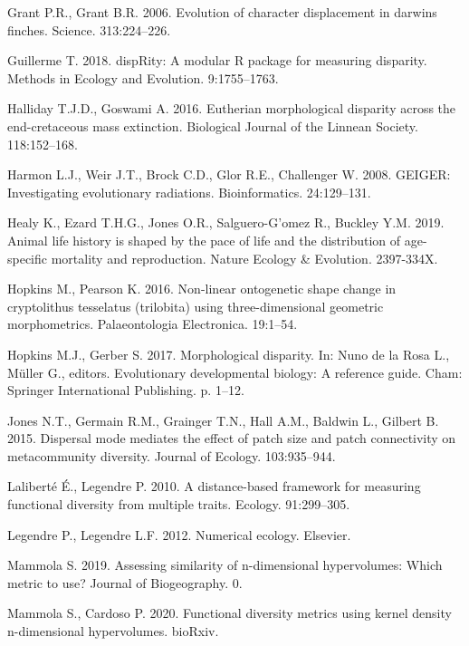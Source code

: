 \documentclass[]{article}
\begin{document}
\hypertarget{ref-grant2006}{}
Grant P.R., Grant B.R. 2006. Evolution of character displacement in
darwins finches. Science. 313:224--226.

\hypertarget{ref-disprity}{}
Guillerme T. 2018. dispRity: A modular R package for measuring
disparity. Methods in Ecology and Evolution. 9:1755--1763.

\hypertarget{ref-halliday2015}{}
Halliday T.J.D., Goswami A. 2016. Eutherian morphological disparity
across the end-cretaceous mass extinction. Biological Journal of the
Linnean Society. 118:152--168.

\hypertarget{ref-geiger2008}{}
Harmon L.J., Weir J.T., Brock C.D., Glor R.E., Challenger W. 2008.
GEIGER: Investigating evolutionary radiations. Bioinformatics.
24:129--131.

\hypertarget{ref-healy2019}{}
Healy K., Ezard T.H.G., Jones O.R., Salguero-G'omez R., Buckley Y.M.
2019. Animal life history is shaped by the pace of life and the
distribution of age-specific mortality and reproduction. Nature Ecology
\& Evolution. 2397-334X.

\hypertarget{ref-hopkins2016}{}
Hopkins M., Pearson K. 2016. Non-linear ontogenetic shape change in
cryptolithus tesselatus (trilobita) using three-dimensional geometric
morphometrics. Palaeontologia Electronica. 19:1--54.

\hypertarget{ref-hopkins2017}{}
Hopkins M.J., Gerber S. 2017. Morphological disparity. In: Nuno de la
Rosa L., Müller G., editors. Evolutionary developmental biology: A
reference guide. Cham: Springer International Publishing. p. 1--12.

\hypertarget{ref-jones2015}{}
Jones N.T., Germain R.M., Grainger T.N., Hall A.M., Baldwin L., Gilbert
B. 2015. Dispersal mode mediates the effect of patch size and patch
connectivity on metacommunity diversity. Journal of Ecology.
103:935--944.

\hypertarget{ref-lalibertuxe92010}{}
Laliberté É., Legendre P. 2010. A distance-based framework for measuring
functional diversity from multiple traits. Ecology. 91:299--305.

\hypertarget{ref-legendre2012}{}
Legendre P., Legendre L.F. 2012. Numerical ecology. Elsevier.

\hypertarget{ref-mammola2019}{}
Mammola S. 2019. Assessing similarity of n-dimensional hypervolumes:
Which metric to use? Journal of Biogeography. 0.

\hypertarget{ref-mammola2020}{}
Mammola S., Cardoso P. 2020. Functional diversity metrics using kernel
density n-dimensional hypervolumes. bioRxiv.
\end{document}
